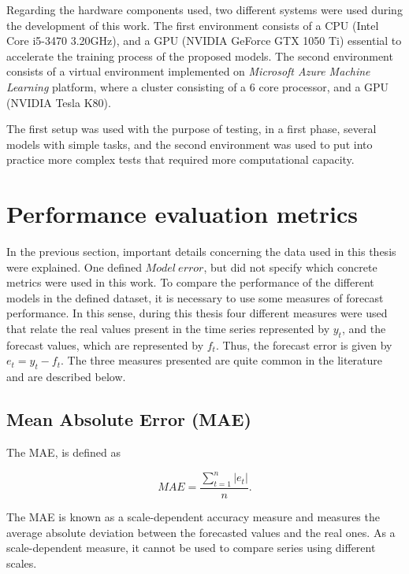 Regarding the hardware components used, two different systems were used during the development of this work. The first environment consists of a CPU (Intel Core i5-3470 3.20GHz), and a GPU (NVIDIA GeForce GTX 1050 Ti) essential to accelerate the training process of the proposed models. The second environment consists of a virtual environment implemented on \textit{Microsoft Azure Machine Learning} platform, where a cluster consisting of a 6 core processor, and a GPU (NVIDIA Tesla K80).

The first setup was used with the purpose of testing, in a first phase, several models with simple tasks, and the second environment was used to put into practice more complex tests that required more computational capacity.
	
\section{Performance evaluation metrics}\label{chap3:sec:performance_evaluation_metrics}

In the previous section, important details concerning the data used in this thesis were explained. One defined $Model\ error$, but did not specify which concrete metrics were used in this work. To compare the performance of the different models in the defined dataset, it is necessary to use some measures of forecast performance. In this sense, during this thesis four different measures were used that relate the real values present in the time series represented by $y_t$, and the forecast values, which are represented by $f_t$. Thus, the forecast error is given by $e_t=y_t-f_t$. The three measures presented are quite common in the literature \cite{errors} and are described below.

\subsection{Mean Absolute Error (MAE)}

The \ac{MAE}, is defined as

\begin{equation}
     MAE =\frac {\sum_{t=1}^n|e_t|}{n}.
\label{mae}
\end{equation}

The \ac{MAE} is known as a scale-dependent accuracy measure and measures the average absolute deviation between the forecasted values and the real ones. As a scale-dependent measure, it cannot be used to compare series using different scales.


